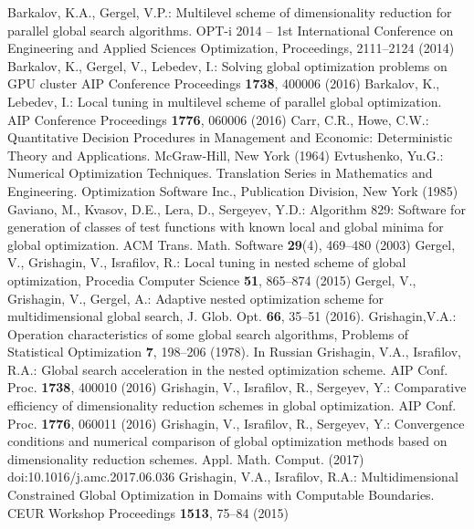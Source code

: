 \begin{thebibliography}{99.}
 Barkalov, K.A., Gergel, V.P.: Multilevel scheme of dimensionality reduction for parallel global search algorithms.  OPT-i 2014 -- 1st International Conference on Engineering and Applied Sciences Optimization, Proceedings, 2111--2124 (2014)
 Barkalov, K., Gergel, V., Lebedev, I.: Solving global optimization problems on GPU cluster  AIP Conference Proceedings \textbf{1738}, 400006 (2016)
 Barkalov, K., Lebedev, I.: Local tuning in multilevel scheme of parallel global optimization.  AIP Conference Proceedings \textbf{1776}, 060006 (2016)
	Carr, C.R., Howe, C.W.: Quantitative Decision Procedures in Management and Economic: Deterministic Theory and Applications. McGraw-Hill, New York (1964)
	Evtushenko, Yu.G.: Numerical Optimization Techniques. Translation Series in Mathematics and Engineering. Optimization Software  Inc., Publication Division, New York (1985)
 Gaviano, M., Kvasov, D.E., Lera, D., Sergeyev, Y.D.: Algorithm 829: Software for generation of classes of test functions with known local and global minima for global optimization. ACM Trans. Math. Software \textbf{29}(4), 469–480 (2003)
 Gergel, V.,  Grishagin, V., Israfilov, R.: Local tuning in nested scheme of global optimization, Procedia Computer Science \textbf{51}, 865--874 (2015) 
	Gergel, V., Grishagin, V., Gergel, A.: Adaptive nested optimization scheme for multidimensional global search, J. Glob. Opt. \textbf{66}, 35–51 (2016).
  Grishagin,V.A.: Operation characteristics of some global search algorithms, Problems of Statistical Optimization \textbf{7},  198--206 (1978). In Russian
	Grishagin, V.A., Israfilov, R.A.: Global search acceleration in the nested optimization scheme. AIP Conf. Proc. \textbf{1738}, 400010 (2016)
 Grishagin, V., Israfilov, R., Sergeyev, Y.: Comparative efficiency of dimensionality reduction schemes in global optimization. AIP Conf. Proc. \textbf{1776}, 060011 (2016)
	Grishagin, V.,  Israfilov, R., Sergeyev, Y.: Convergence conditions and numerical comparison of global optimization methods based on dimensionality reduction schemes. Appl. Math.  Comput. (2017) doi:10.1016/j.amc.2017.06.036
Grishagin, V.A., Israfilov, R.A.: Multidimensional Constrained Global Optimization in Domains with Computable Boundaries. CEUR Workshop Proceedings \textbf{1513}, 75--84 (2015)

\end{thebibliography}
